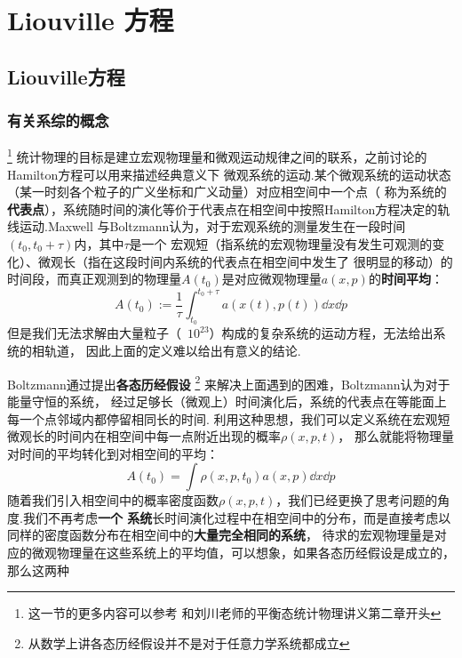 \chapter{Liouville 方程}
    \section{Liouville方程}
    \subsection{有关系综的概念}\footnote{这一节的更多内容可以参考\cite{Tuckerman2010Statistical}
    和刘川老师的平衡态统计物理讲义第二章开头}
    统计物理的目标是建立宏观物理量和微观运动规律之间的联系，之前讨论的Hamilton方程可以用来描述经典意义下
    微观系统的运动.某个微观系统的运动状态（某一时刻各个粒子的广义坐标和广义动量）对应相空间中一个点（
    称为系统的\textbf{代表点}），系统随时间的演化等价于代表点在相空间中按照Hamilton方程决定的轨线运动.Maxwell
    与Boltzmann认为，对于宏观系统的测量发生在一段时间$(t_0, t_0 + \tau)$内，其中$\tau$是一个
    宏观短（指系统的宏观物理量没有发生可观测的变化）、微观长（指在这段时间内系统的代表点在相空间中发生了
    很明显的移动）的时间段，而真正观测到的物理量$A(t_0)$是对应微观物理量$a(x,p)$的\textbf{时间平均}：
    \begin{equation}
        A(t_0) := \frac{1}{\tau}\int_{t_0}^{t_0+\tau}a(x(t), p(t))\dd x\dd p
    \end{equation}
    但是我们无法求解由大量粒子（~$10^{23}$）构成的复杂系统的运动方程，无法给出系统的相轨道，
    因此上面的定义难以给出有意义的结论.
    \par 
    Boltzmann通过提出\textbf{各态历经假设}
    \footnote{从数学上讲各态历经假设并不是对于任意力学系统都成立}
    来解决上面遇到的困难，Boltzmann认为对于能量守恒的系统，
    经过足够长（微观上）时间演化后，系统的代表点在等能面上每一个点邻域内都停留相同长的时间.
    利用这种思想，我们可以定义系统在宏观短微观长的时间内在相空间中每一点附近出现的概率$\rho(x, p, t)$，
    那么就能将物理量对时间的平均转化到对相空间的平均：
    \begin{equation}
        A(t_0) = \int\rho(x, p, t_0)a(x, p)\dd x\dd p
    \end{equation}
    随着我们引入相空间中的概率密度函数$\rho(x, p, t)$，我们已经更换了思考问题的角度.我们不再考虑\textbf{一个
    系统}长时间演化过程中在相空间中的分布，而是直接考虑以同样的密度函数分布在相空间中的\textbf{大量完全相同的系统}，
    待求的宏观物理量是对应的微观物理量在这些系统上的平均值，可以想象，如果各态历经假设是成立的，那么这两种

